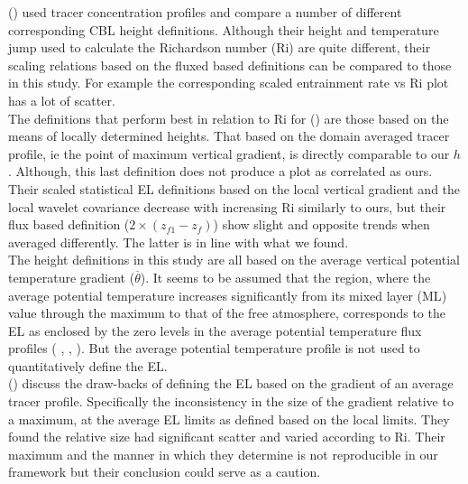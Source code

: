 \citeauthor{BrooksFowler2} (\cite{BrooksFowler2}) used tracer concentration profiles and compare a number of different corresponding \acs{CBL} height definitions.  Although their height and temperature jump used to calculate the Richardson number (\acs{Ri}) are quite different, their scaling relations based on the fluxed based definitions can be compared to those in this study. For example the corresponding scaled entrainment rate vs \acs{Ri} plot has a lot of scatter.\\

The definitions that perform best in relation to \acs{Ri} for \citeauthor{BrooksFowler2} (\cite{BrooksFowler2}) are those based on the means of locally determined heights.  That based on the domain averaged tracer profile, ie the point of maximum vertical gradient, is directly comparable to our $h$. Although, this last definition does not produce a plot as correlated as ours.\\  

Their scaled statistical \acs{EL} definitions based on the local vertical gradient and the local wavelet covariance decrease with increasing \acs{Ri} similarly to ours, but their flux based definition ($2\times(z_{f1}-z_{f})$) show slight and opposite trends when averaged differently.  The latter is in line with what we found.\\


The height definitions in this study are all based on the average vertical potential temperature gradient ($\overline{\theta}$).  It seems to be assumed that the region, where the average potential temperature increases significantly from its mixed layer (\acs{ML}) value through the maximum to that of the free atmosphere, corresponds to the \acs{EL} as enclosed by the zero levels in the average potential temperature flux profiles (\citeauthor{Deardorff79} \cite{Deardorff79}, \citeauthor{FedConzMir04} 
\cite{FedConzMir04}, \citeauthor{GarciaMellado} \cite{GarciaMellado}).  But the average potential temperature profile is not used to quantitatively define the \acs{EL}.\\

\citeauthor{BrooksFowler2} (\cite{BrooksFowler2}) discuss the draw-backs of defining the \acs{EL} based on the 
gradient of an average tracer profile.  Specifically the inconsistency in the size of the gradient
relative to a maximum, at the average \acs{EL} limits as defined based on the local limits. They
found the relative size had significant scatter and varied according to \acs{Ri}. Their maximum and the manner in which they determine is not reproducible in our framework but their conclusion could serve as a caution.\\  

